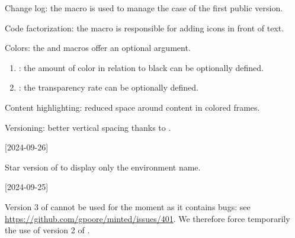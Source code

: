 \begin{tdocnew}
    \item Change log: the  macro is used to manage the case of the first public version.

    \item Code factorization: the  macro is responsible for adding icons in front of text.
\end{tdocnew}


\begin{tdocupdate}
    \item Colors: the  and  macros offer an optional argument.
    \begin{enumerate}
        \item {}: the amount of color in relation to black can be optionally defined.

        \item {}: the transparency rate can be optionally defined.
    \end{enumerate}

    \item Content highlighting: reduced space around content in colored frames.

    \item Versioning: better vertical spacing thanks to .
\end{tdocupdate}

\tdocsep




[2024-09-26]

\small

\begin{tdocnew}
    \item Star version of  to display only the environment name.
\end{tdocnew}

\tdocsep




[2024-09-25]

\small

\begin{tdoctech}
    \item Version 3 of  cannot be used for the moment as it contains bugs: see \url{https://github.com/gpoore/minted/issues/401}. We therefore force temporarily the use of version 2 of .
\end{tdoctech}


